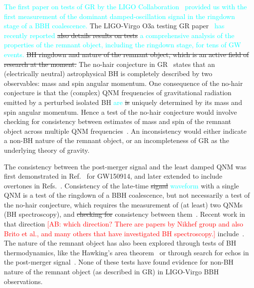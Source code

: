 \documentclass[twocolumn,prd,aps,superscriptaddress,preprintnumbers,tightenlines,showpacs,nofootinbib,eqsecnum,amsfonts,amsmath]{revtex4-1}
\newcommand{\ab}[1]{\textcolor{cyan}{#1}}
\newcommand{\comment}[1]{\textcolor{red}{[#1]}}
\begin{document}
\ab{The first paper on tests of GR by the LIGO Collaboration~\cite{} provided us with the 
first measurement of the dominant damped-oscillation signal in the ringdown stage of a BBH 
coalescence.} The LIGO-Virgo O3a testing GR paper~\cite{} \ab{has recently reported} 
\sout{also details results on tests} \ab{a comprehensive analysis of the properties of the 
remnant object, including the ringdown stage, for tens of GW events.}   
\sout{BH ringdown and nature of the remnant object, which is an active field
of research at the moment.} The no-hair conjecture in GR~\citep{}
states that an (electrically neutral) astrophysical BH is completely
described by two observables: mass and spin angular momentum. One
consequence of the no-hair conjecture is that the (complex) QNM
frequencies of gravitational radiation emitted by a perturbed isolated
BH \ab{are} \sout{is} uniquely determined by its mass and spin angular momentum. Hence
a test of the no-hair conjecture would involve checking for
consistency between estimates of mass and spin of the remnant object
across multiple QNM frequencies~\cite{Dreyer:2003bv}. An inconsistency would either
indicate a non-BH nature of the remnant object, or an incompleteness
of GR as the underlying theory of gravity. 

The consistency between the post-merger signal and the least damped QNM was first demonstrated in 
Ref.~\citep{LSC_2016grtests} for GW150914, and later extended to include
overtones in Refs.~\citep{Brito:2018rfr,Giesler:2019uxc,Isi:2019aib,Bhagwat:2019dtm,Forteza:2020hbw}. Consistency
of the late-time \sout{signal} \ab{waveform} with a single QNM is a test of the ringdown of
a BBH coalescence, but not necessarily a test of the no-hair
conjecture, which requires the measurement of (at least) two QNMs (BH
spectroscopy), and \sout{checking for} consistency between them~\cite{Dreyer:2003bv,Berti:2005ys}. Recent work
in that direction \comment{AB: which direction? There are papers by Nikhef group and 
also Brito et al., and many others that have investigated BH spectroscopy.} include~\citep{Carullo:2018gah,Carullo:2019flw,Bhagwat:2019bwv}. The
nature of the remnant object has also been explored through tests of
BH thermodynamics, like the Hawking's area
theorem~\citep{Cabero:2017avf} or through search for echos in the
post-merger
signal~\citep{Nielsen:2018lkf,Tsang:2019zra,Lo:2018sep,Abedi:2018npz,Abedi:2020sgg,Testa:2018bzd}. None
of these tests have found evidence for non-BH nature of the remnant
object (as described in GR) in LIGO-Virgo BBH observations.
\end{document}
